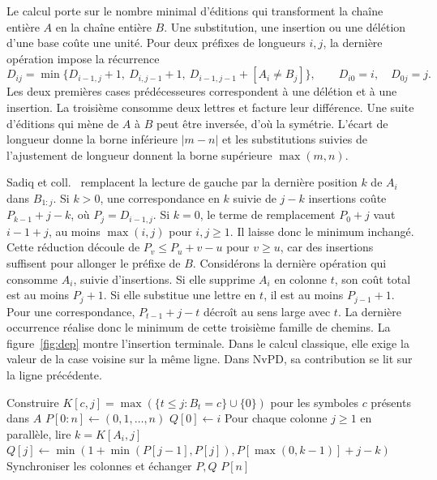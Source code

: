 Le calcul porte sur le nombre minimal d'éditions qui transforment la chaîne entière \(A\) en la chaîne entière \(B\). Une substitution, une insertion ou une délétion d'une base coûte une unité. Pour deux préfixes de longueurs \(i,j\), la dernière opération impose la récurrence
\[
 D_{ij}=\min\{D_{i-1,j}+1,\ D_{i,j-1}+1,\ D_{i-1,j-1}+[A_i\ne B_j]\},
 \qquad D_{i0}=i,\quad D_{0j}=j.
\]
Les deux premières cases prédécesseures correspondent à une délétion et à une insertion. La troisième consomme deux lettres et facture leur différence. Une suite d'éditions qui mène de \(A\) à \(B\) peut être inversée, d'où la symétrie. L'écart de longueur donne la borne inférieure \(\lvert m-n\rvert\) et les substitutions suivies de l'ajustement de longueur donnent la borne supérieure \(\max(m,n)\).

Sadiq et coll.~\cite{sadiq} remplacent la lecture de gauche par la dernière position \(k\) de \(A_i\) dans \(B_{1:j}\). Si \(k>0\), une correspondance en \(k\) suivie de \(j-k\) insertions coûte \(P_{k-1}+j-k\), où \(P_j=D_{i-1,j}\). Si \(k=0\), le terme de remplacement \(P_0+j\) vaut \(i-1+j\), au moins \(\max(i,j)\) pour \(i,j\ge1\). Il laisse donc le minimum inchangé.
Cette réduction découle de \(P_v\le P_u+v-u\) pour \(v\ge u\), car des insertions suffisent pour allonger le préfixe de \(B\). Considérons la dernière opération qui consomme \(A_i\), suivie d'insertions. Si elle supprime \(A_i\) en colonne \(t\), son coût total est au moins \(P_j+1\). Si elle substitue une lettre en \(t\), il est au moins \(P_{j-1}+1\). Pour une correspondance, \(P_{t-1}+j-t\) décroît au sens large avec \(t\). La dernière occurrence réalise donc le minimum de cette troisième famille de chemins.
La figure~\ref{fig:dep} montre l'insertion terminale. Dans le calcul classique, elle exige la valeur de la case voisine sur la même ligne. Dans NvPD, sa contribution se lit sur la ligne précédente.
\begin{algorithmic}[1]
\State Construire \(K[c,j]=\max(\{t\le j:B_t=c\}\cup\{0\})\) pour les symboles \(c\) présents dans \(A\)
\State \(P[0:n]\gets(0,1,\ldots,n)\)
\State \(Q[0]\gets i\)
\State Pour chaque colonne \(j\ge1\) en parallèle, lire \(k=K[A_i,j]\)
\State \hspace{1em}\(Q[j]\gets\min(1+\min(P[j-1],P[j]),P[\max(0,k-1)]+j-k)\)
\State Synchroniser les colonnes et échanger \(P,Q\)
\EndFor
\State \Return \(P[n]\)
\end{algorithmic}

